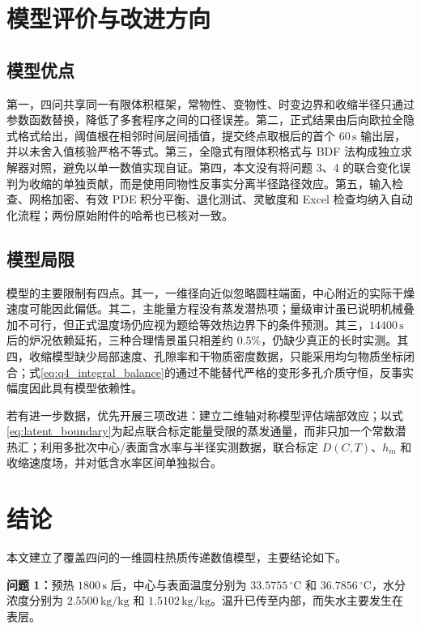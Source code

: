 \documentclass[UTF8,a4paper,zihao=-4,fontset=fandol]{ctexart}
\newcommand{\unit}[1]{\,\mathrm{#1}}
\begin{document}
\section{模型评价与改进方向}

\subsection{模型优点}

第一，四问共享同一有限体积框架，常物性、变物性、时变边界和收缩半径只通过参数函数替换，降低了多套程序之间的口径误差。第二，正式结果由后向欧拉全隐式格式给出，阈值根在相邻时间层间插值，提交终点取根后的首个 $60\unit{s}$ 输出层，并以未舍入值核验严格不等式。第三，全隐式有限体积格式与 BDF 法构成独立求解器对照，避免以单一数值实现自证。第四，本文没有将问题 3、4 的联合变化误判为收缩的单独贡献，而是使用同物性反事实分离半径路径效应。第五，输入检查、网格加密、有效 PDE 积分平衡、退化测试、灵敏度和 Excel 检查均纳入自动化流程；两份原始附件的哈希也已核对一致。

\subsection{模型局限}

模型的主要限制有四点。其一，一维径向近似忽略圆柱端面，中心附近的实际干燥速度可能因此偏低。其二，主能量方程没有蒸发潜热项；量级审计虽已说明机械叠加不可行，但正式温度场仍应视为题给等效热边界下的条件预测。其三，$14400\unit{s}$ 后的炉况依赖延拓，三种合理情景虽只相差约 $0.5\%$，仍缺少真正的长时实测。其四，收缩模型缺少局部速度、孔隙率和干物质密度数据，只能采用均匀物质坐标闭合；式\eqref{eq:q4_integral_balance}的通过不能替代严格的变形多孔介质守恒，反事实幅度因此具有模型依赖性。

若有进一步数据，优先开展三项改进：建立二维轴对称模型评估端部效应；以式\eqref{eq:latent_boundary}为起点联合标定能量受限的蒸发通量，而非只加一个常数潜热汇；利用多批次中心/表面含水率与半径实测数据，联合标定 $D(C,T)$、$h_m$ 和收缩速度场，并对低含水率区间单独拟合。

\section{结论}

本文建立了覆盖四问的一维圆柱热质传递数值模型，主要结论如下。

\textbf{问题 1：}预热 $1800\unit{s}$ 后，中心与表面温度分别为 $33.5755\,^{\circ}\mathrm{C}$ 和 $36.7856\,^{\circ}\mathrm{C}$，水分浓度分别为 $2.5500\unit{kg/kg}$ 和 $1.5102\unit{kg/kg}$。温升已传至内部，而失水主要发生在表层。
\end{document}
